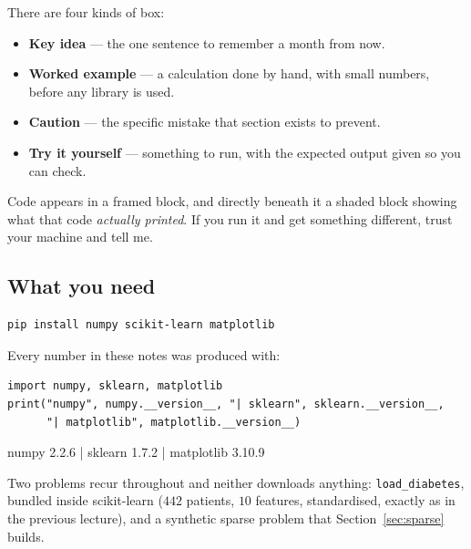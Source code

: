 \documentclass[11pt]{article}
\begin{document}
There are four kinds of box:

\begin{itemize}[leftmargin=*]
  \item \textbf{Key idea} --- the one sentence to remember a month from now.
  \item \textbf{Worked example} --- a calculation done by hand, with small
    numbers, before any library is used.
  \item \textbf{Caution} --- the specific mistake that section exists to
    prevent.
  \item \textbf{Try it yourself} --- something to run, with the expected output
    given so you can check.
\end{itemize}

Code appears in a framed block, and directly beneath it a shaded block showing
what that code \emph{actually printed}. If you run it and get something
different, trust your machine and tell me.

\subsection{What you need}

\begin{lstlisting}
pip install numpy scikit-learn matplotlib
\end{lstlisting}

Every number in these notes was produced with:

\begin{lstlisting}
import numpy, sklearn, matplotlib
print("numpy", numpy.__version__, "| sklearn", sklearn.__version__,
      "| matplotlib", matplotlib.__version__)
\end{lstlisting}
\begin{codeout}
numpy 2.2.6 | sklearn 1.7.2 | matplotlib 3.10.9
\end{codeout}

Two problems recur throughout and neither downloads anything:
\texttt{load\_diabetes}, bundled inside scikit-learn ($442$ patients, $10$
features, standardised, exactly as in the previous lecture), and a synthetic
sparse problem that Section~\ref{sec:sparse} builds.
\end{document}
